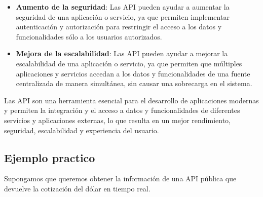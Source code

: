 \documentclass[executivepaper]{article}
\begin{document}
\begin{itemize}
\item \textbf{Aumento de la seguridad}: Las API pueden ayudar a aumentar la seguridad de una aplicación o servicio, ya que permiten implementar autenticación y autorización para restringir el acceso a los datos y funcionalidades sólo a los usuarios autorizados. 

\item \textbf{Mejora de la escalabilidad}: Las API pueden ayudar a mejorar la escalabilidad de una aplicación o servicio, ya que permiten que múltiples aplicaciones y servicios accedan a los datos y funcionalidades de una fuente centralizada de manera simultánea, sin causar una sobrecarga en el sistema.
\end{itemize}

Las API son una herramienta esencial para el desarrollo de aplicaciones modernas y permiten la integración y el acceso a datos y funcionalidades de diferentes servicios y aplicaciones externas, lo que resulta en un mejor rendimiento, seguridad, escalabilidad y experiencia del usuario.

\subsection{Ejemplo practico}
Supongamos que queremos obtener la información de una API pública que devuelve la cotización del dólar en tiempo real. 
\end{document}
